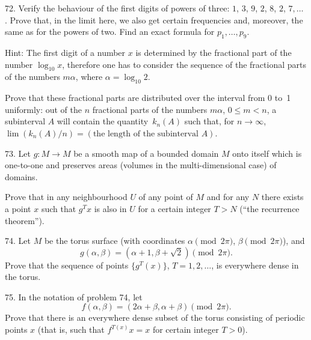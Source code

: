\begin{problem}{72.}
	Verify the behaviour of the first digits of powers of three: $1$,
	$3$, $9$, $2$, $8$, $2$, $7, \dots$ . Prove that, in the limit here, we also 
	get certain frequencies and, moreover, the same as for the powers of two.
	Find an exact formula for $p_1, \dots, p_9$.

	\begin{note}{Hint:}
		The first digit of a number $x$ is determined by the fractional part
		of the number $\log_{10} x$, therefore one has to consider the sequence of the fractional parts of
		the numbers $m \alpha$, where $\alpha=\log_{10} 2$.
	\end{note}
	Prove that these fractional parts are distributed over the interval from 0 to~1
	uniformly: out of the $n$ fractional parts of the numbers $m \alpha$, $0 \leqslant m<n$,
	a subinterval $A$ will contain the quantity~$k_n (A)$ such that, for $n \to \infty$,
	$\lim (k_n (A)/n)=(\text{the length of the subinterval~$A$})$.
\end{problem}

\begin{problem}{73.}
	Let $g\colon M \to M$ be a smooth map of a bounded domain $M$ onto itself which
	is one-to-one and preserves areas (volumes in the multi-dimensional case) of domains.

	Prove that in any neighbourhood $U$ of any point of $M$ and for any $N$ there exists a point $x$
	such that $g^T x$ is also in $U$ for a certain integer $T>N$ (\enquote{the recurrence theorem}).
\end{problem}

\begin{problem}{74.}
	Let $M$ be the torus surface (with coordinates $\alpha \pmod{2\pi}$, $\beta \pmod{2\pi}$), 
	and
	\begin{equation*}
		g(\alpha, \beta)=(\alpha+1, \beta+ \sqrt{2}) \pmod{2\pi}.
	\end{equation*}
	Prove that the sequence of points
	$\{g^T (x)\}$, $T=1, 2, \dotsc$, is everywhere dense in the torus.
\end{problem}

\begin{problem}{75.}
	In the notation of problem 74, let
	\begin{equation*}
		f(\alpha, \beta)=(2\alpha+\beta,\alpha+\beta) \pmod{2\pi}.
	\end{equation*}
	Prove that there is an everywhere dense subset of the torus consisting of periodic points $x$ (that is, such that 
	$f^{T (x)} x=x$ for certain integer $T>0$).
\end{problem}

